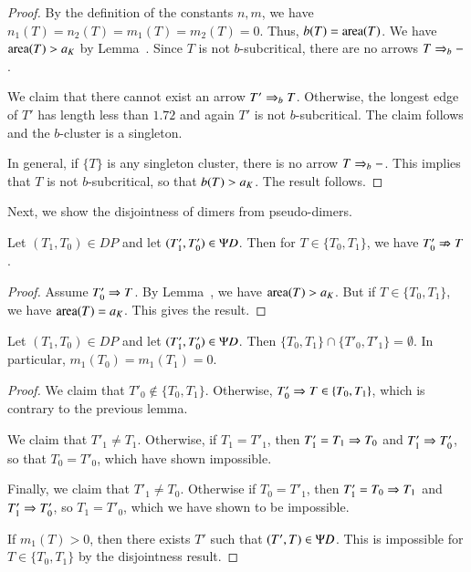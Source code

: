 \begin{proof}  By the definition of the constants $n,m$, we have $n_1(T)=n_2(T) = m_1(T)=m_2(T)=0$.
Thus, $b(T)={\operatorname{area}}(T)$.  We have ${\operatorname{area}}(T) > a_K$ by Lemma~.  Since $T$ is not $b$-subcritical,
there are no arrows $T\Rightarrow_{b} -$.  

We claim that there cannot exist an arrow $T'\Rightarrow_{b} T$.
Otherwise,  the longest edge of $T'$ has length less than $1.72$
and again $T'$ is not $b$-subcritical.  The claim follows and the $b$-cluster is a singleton.

In general, if $\{T\}$ is any singleton cluster, there is no arrow $T\Rightarrow_{b} -$.  This implies that $T$ is not
$b$-subcritical, so that $b(T) > a_K$.  The result follows.
\end{proof}

Next,
we show the disjointness of dimers from pseudo-dimers.  

\begin{lemma} Let $(T_1,T_0)\in DP$ and let $(T'_1,T'_0)\in\Psi D$.  Then for $T\in\{T_0,T_1\}$,
we have
$T'_0\nRightarrow T$.
\end{lemma}

\begin{proof} Assume  $T'_0\Rightarrow T$.  By Lemma~,
we have ${\operatorname{area}}(T)>a_K$.  But if $T\in\{T_0,T_1\}$, we have ${\operatorname{area}}(T)=a_K$.
This gives the result.
\end{proof}

\begin{lemma}  Let $(T_1,T_0)\in DP$ and let $(T'_1,T'_0)\in\Psi D$.  Then
$\{T_0,T_1\}\cap \{T'_0,T'_1\} = \emptyset$.  In particular, $m_1(T_0) = m_1(T_1)=0$.
\end{lemma}

\begin{proof}
We claim that $T'_0\not\in \{T_0,T_1\}$.  Otherwise, $T'_0\Rightarrow T\in\{T_0,T_1\}$, which is contrary
to the previous lemma.

We claim that $T'_1\ne T_1$.  Otherwise, if $T_1=T'_1$, then $T'_1=T_1\Rightarrow T_0$ and $T'_1\Rightarrow T'_0$,
so that $T_0 = T'_0$, which have shown impossible.

Finally, we claim that $T'_1\ne T_0$.  Otherwise if $T_0 = T'_1$, then $T'_1 = T_0\Rightarrow T_1$ and
$T'_1\Rightarrow T'_0$, so $T_1 = T'_0$, which we have shown to be impossible.

If $m_1(T) >0$, then there exists $T'$ such that $(T',T)\in \Psi D$.  This is impossible for $T\in\{T_0,T_1\}$ by the
disjointness result.
\end{proof}

